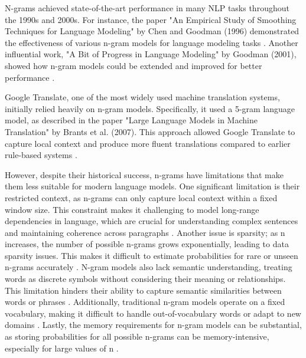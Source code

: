 \documentclass[a4paper, oneside]{discothesis}
\begin{document}
N-grams achieved state-of-the-art performance in many NLP tasks throughout the 1990s and 2000s. For instance, the paper "An Empirical Study of Smoothing Techniques for Language Modeling" by Chen and Goodman (1996) demonstrated the effectiveness of various n-gram models for language modeling tasks \cite{chen1996empirical}. Another influential work, "A Bit of Progress in Language Modeling" by Goodman (2001), showed how n-gram models could be extended and improved for better performance \cite{goodman2001bit}.

Google Translate, one of the most widely used machine translation systems, initially relied heavily on n-gram models. Specifically, it used a 5-gram language model, as described in the paper "Large Language Models in Machine Translation" by Brants et al. (2007). This approach allowed Google Translate to capture local context and produce more fluent translations compared to earlier rule-based systems \cite{brants2007large}.

However, despite their historical success, n-grams have limitations that make them less suitable for modern language models. One significant limitation is their restricted context, as n-grams can only capture local context within a fixed window size. This constraint makes it challenging to model long-range dependencies in language, which are crucial for understanding complex sentences and maintaining coherence across paragraphs \cite{bengio2003neural}. Another issue is sparsity; as n increases, the number of possible n-grams grows exponentially, leading to data sparsity issues. This makes it difficult to estimate probabilities for rare or unseen n-grams accurately \cite{katz1987estimation}. N-gram models also lack semantic understanding, treating words as discrete symbols without considering their meaning or relationships. This limitation hinders their ability to capture semantic similarities between words or phrases \cite{mikolov2013distributed}. Additionally, traditional n-gram models operate on a fixed vocabulary, making it difficult to handle out-of-vocabulary words or adapt to new domains \cite{jelinek1980interpolated}. Lastly, the memory requirements for n-gram models can be substantial, as storing probabilities for all possible n-grams can be memory-intensive, especially for large values of n \cite{heafield2011kenlm}.
\end{document}

